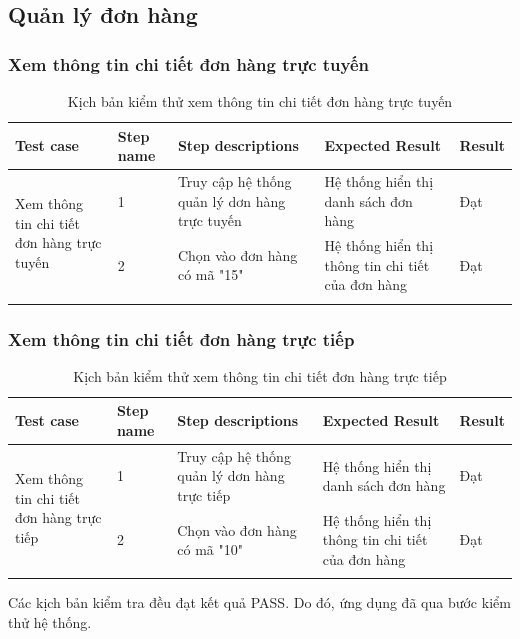 \subsection{Quản lý đơn hàng}
\subsubsection{ Xem thông tin chi tiết đơn hàng trực tuyến}
{
    \setlength\extrarowheight{6pt}
    \begin{longtable}{| p{2.5cm}| p{1cm}| p{5.5cm}| p{4.5cm} | p{1.5cm} |}
        \hline
        \textbf{Test case}                                                  & \textbf{Step name} & \textbf{Step descriptions}                    & \textbf{Expected Result}                          & \textbf{Result} \\
        \hline
        \multirow[t]{2}{2.5cm}{ Xem thông tin chi tiết đơn hàng trực tuyến} & 1                  & Truy cập hệ thống quản lý dơn hàng trực tuyến & Hệ thống hiển thị danh sách đơn hàng              & Đạt             \\
        \cline{2-5}
                                                                            & 2                  & Chọn vào đơn hàng có mã "15"                  & Hệ thống hiển thị thông tin chi tiết của đơn hàng & Đạt             \\
        \hline
        \caption{Kịch bản kiểm thử xem thông tin chi tiết đơn hàng trực tuyến}
    \end{longtable}
}

\subsubsection{ Xem thông tin chi tiết đơn hàng trực tiếp}
{
    \setlength\extrarowheight{6pt}
    \begin{longtable}{| p{2.5cm}| p{1cm}| p{5.5cm}| p{4.5cm} | p{1.5cm} |}
        \hline
        \textbf{Test case}                                                 & \textbf{Step name} & \textbf{Step descriptions}                   & \textbf{Expected Result}                          & \textbf{Result} \\
        \hline
        \multirow[t]{2}{2.5cm}{ Xem thông tin chi tiết đơn hàng trực tiếp} & 1                  & Truy cập hệ thống quản lý dơn hàng trực tiếp & Hệ thống hiển thị danh sách đơn hàng              & Đạt             \\
        \cline{2-5}
                                                                           & 2                  & Chọn vào đơn hàng có mã "10"                 & Hệ thống hiển thị thông tin chi tiết của đơn hàng & Đạt             \\
        \hline
        \caption{Kịch bản kiểm thử xem thông tin chi tiết đơn hàng trực tiếp}
    \end{longtable}
}
Các kịch bản kiểm tra đều đạt kết quả PASS. Do đó, ứng dụng đã qua bước kiểm thử hệ thống.